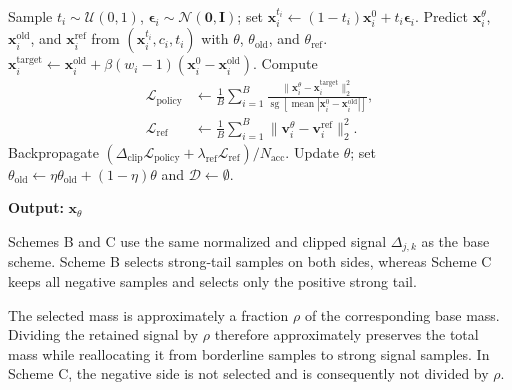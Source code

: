 \documentclass{article} %
\begin{document}
\begin{algorithm}[H]
\begin{algorithmic}[1]
                \State Sample $t_i\sim\mathcal{U}(0,1)$,
                $\boldsymbol{\epsilon}_i\sim\mathcal{N}(\mathbf{0},\mathbf{I})$;
                set $\mathbf{x}_i^{t_i}\leftarrow
                (1-t_i)\mathbf{x}_i^0+t_i\boldsymbol{\epsilon}_i$.
                \State Predict $\mathbf{x}_i^\theta$,
                $\mathbf{x}_i^{\mathrm{old}}$, and $\mathbf{x}_i^{\mathrm{ref}}$
                from $(\mathbf{x}_i^{t_i},c_i,t_i)$ with
                $\theta$, $\theta_{\mathrm{old}}$, and $\theta_{\mathrm{ref}}$.
                \State $\mathbf{x}_i^{\mathrm{target}}\leftarrow
                \mathbf{x}_i^{\mathrm{old}}+
                \beta(w_i-1)(\mathbf{x}_i^0-\mathbf{x}_i^{\mathrm{old}})$.
                \State Compute
                \[
                    \begin{aligned}
                    \mathcal{L}_{\mathrm{policy}}
                    &\leftarrow\frac{1}{B}\sum_{i=1}^{B}
                    \frac{\|\mathbf{x}_i^\theta-\mathbf{x}_i^{\mathrm{target}}\|_2^2}
                    {\operatorname{sg}[\operatorname{mean}
                    |\mathbf{x}_i^0-\mathbf{x}_i^{\mathrm{old}}|]},\\
                    \mathcal{L}_{\mathrm{ref}}
                    &\leftarrow\frac{1}{B}\sum_{i=1}^{B}
                    \|\mathbf{v}_i^\theta-\mathbf{v}_i^{\mathrm{ref}}\|_2^2.
                    \end{aligned}
                \]
                \State Backpropagate
                $(\Delta_{\mathrm{clip}}\mathcal{L}_{\mathrm{policy}}+
                \lambda_{\mathrm{ref}}\mathcal{L}_{\mathrm{ref}})/N_{\mathrm{acc}}$.
            \EndFor
            \State Update $\theta$; set
            $\theta_{\mathrm{old}}\leftarrow
            \eta\theta_{\mathrm{old}}+(1-\eta)\theta$ and
            $\mathcal{D}\leftarrow\emptyset$.
        \EndFor
    \end{algorithmic}
    \textbf{Output:} $\mathbf{x}_\theta$
\end{algorithm}

Schemes B and C use the same normalized and clipped signal
$\Delta_{j,k}$ as the base scheme.  Scheme B selects strong-tail samples on
both sides, whereas Scheme C keeps all negative samples and selects only the
positive strong tail.

The selected mass is approximately a fraction $\rho$ of the corresponding
base mass.  Dividing the retained signal by $\rho$ therefore approximately
preserves the total mass while reallocating it from
borderline samples to strong signal samples.  In Scheme C, the negative side is not
selected and is consequently not divided by $\rho$.
\end{document}
